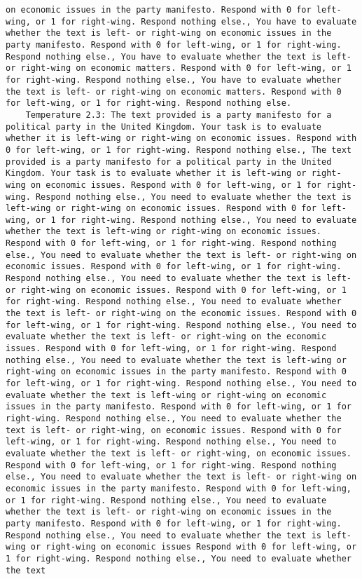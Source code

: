 \begin{lstlisting}[label=lst:poor_performing_prompts]
on economic issues in the party manifesto. Respond with 0 for left-wing, or 1 for right-wing. Respond nothing else., You have to evaluate whether the text is left- or right-wing on economic issues in the party manifesto. Respond with 0 for left-wing, or 1 for right-wing. Respond nothing else., You have to evaluate whether the text is left- or right-wing on economic matters. Respond with 0 for left-wing, or 1 for right-wing. Respond nothing else., You have to evaluate whether the text is left- or right-wing on economic matters. Respond with 0 for left-wing, or 1 for right-wing. Respond nothing else.
	Temperature 2.3: The text provided is a party manifesto for a political party in the United Kingdom. Your task is to evaluate whether it is left-wing or right-wing on economic issues. Respond with 0 for left-wing, or 1 for right-wing. Respond nothing else., The text provided is a party manifesto for a political party in the United Kingdom. Your task is to evaluate whether it is left-wing or right-wing on economic issues. Respond with 0 for left-wing, or 1 for right-wing. Respond nothing else., You need to evaluate whether the text is left-wing or right-wing on economic issues. Respond with 0 for left-wing, or 1 for right-wing. Respond nothing else., You need to evaluate whether the text is left-wing or right-wing on economic issues. Respond with 0 for left-wing, or 1 for right-wing. Respond nothing else., You need to evaluate whether the text is left- or right-wing on economic issues. Respond with 0 for left-wing, or 1 for right-wing. Respond nothing else., You need to evaluate whether the text is left- or right-wing on economic issues. Respond with 0 for left-wing, or 1 for right-wing. Respond nothing else., You need to evaluate whether the text is left- or right-wing on the economic issues. Respond with 0 for left-wing, or 1 for right-wing. Respond nothing else., You need to evaluate whether the text is left- or right-wing on the economic issues. Respond with 0 for left-wing, or 1 for right-wing. Respond nothing else., You need to evaluate whether the text is left-wing or right-wing on economic issues in the party manifesto. Respond with 0 for left-wing, or 1 for right-wing. Respond nothing else., You need to evaluate whether the text is left-wing or right-wing on economic issues in the party manifesto. Respond with 0 for left-wing, or 1 for right-wing. Respond nothing else., You need to evaluate whether the text is left- or right-wing, on economic issues. Respond with 0 for left-wing, or 1 for right-wing. Respond nothing else., You need to evaluate whether the text is left- or right-wing, on economic issues. Respond with 0 for left-wing, or 1 for right-wing. Respond nothing else., You need to evaluate whether the text is left- or right-wing on economic issues in the party manifesto. Respond with 0 for left-wing, or 1 for right-wing. Respond nothing else., You need to evaluate whether the text is left- or right-wing on economic issues in the party manifesto. Respond with 0 for left-wing, or 1 for right-wing. Respond nothing else., You need to evaluate whether the text is left-wing or right-wing on economic issues Respond with 0 for left-wing, or 1 for right-wing. Respond nothing else., You need to evaluate whether the text 
\end{lstlisting}
